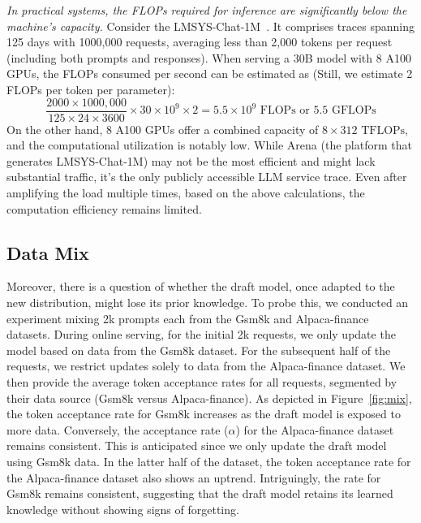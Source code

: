 \emph{In practical systems, the FLOPs required for inference are significantly below the machine's capacity.} 
Consider the LMSYS-Chat-1M~\cite{zheng2023lmsyschat1m}. It comprises traces spanning 125 days with 1000,000 requests, averaging less than 2,000 tokens per request (including both prompts and responses).
When serving a 30B model with 8 A100 GPUs, the FLOPs consumed per second can be estimated as (Still, we estimate 2 FLOPs per token per parameter):
\[ \frac{2000 \times 1000,000}{125 \times 24 \times 3600} \times 30 \times 10^9 \times 2 = 5.5 \times 10^9 \text{ FLOPs or 5.5 GFLOPs} \]
On the other hand, 8 A100 GPUs offer a combined capacity of \( 8 \times 312 \text{ TFLOPs} \), and the computational utilization is notably low. 
While Arena (the platform that generates LMSYS-Chat-1M) may not be the most efficient and might lack substantial traffic, it's the only publicly accessible LLM service trace. 
Even after amplifying the load multiple times, based on the above calculations, the computation efficiency remains limited.


\subsection{Data Mix}
\label{appendix:data-mix}
Moreover, there is a question of whether the draft model, once adapted to the new distribution, might lose its prior knowledge. 
To probe this, we conducted an experiment mixing 2k prompts each from the Gsm8k and Alpaca-finance datasets. 
During online serving, for the initial 2k requests, we only update the model based on data from the Gsm8k dataset. 
For the subsequent half of the requests, we restrict updates solely to data from the Alpaca-finance dataset. 
We then provide the average token acceptance rates for all requests, segmented by their data source (Gsm8k versus Alpaca-finance).
As depicted in Figure~\ref{fig:mix}, the token acceptance rate for Gsm8k increases as the draft model 
is exposed to more data. Conversely, the acceptance rate (\(\alpha\)) for the Alpaca-finance dataset remains consistent. 
This is anticipated since we only update the draft model using Gsm8k data. In the latter half of the dataset, 
the token acceptance rate for the Alpaca-finance dataset also shows an uptrend. Intriguingly, the rate for Gsm8k remains consistent, 
suggesting that the draft model retains its learned knowledge without showing signs of forgetting.

